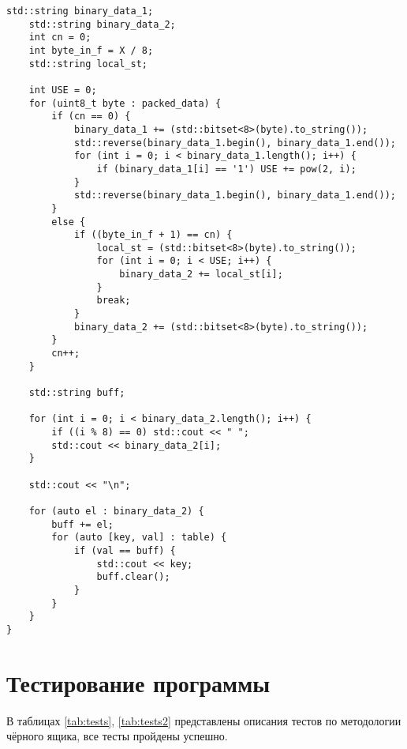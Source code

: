 \begin{lstlisting}[label = list1, caption = Программная реализация описанных алгоритмов]
	std::string binary_data_1;
	std::string binary_data_2;
	int cn = 0;
	int byte_in_f = X / 8;
	std::string local_st;
	
	int USE = 0;
	for (uint8_t byte : packed_data) {
		if (cn == 0) {
			binary_data_1 += (std::bitset<8>(byte).to_string());
			std::reverse(binary_data_1.begin(), binary_data_1.end());
			for (int i = 0; i < binary_data_1.length(); i++) {
				if (binary_data_1[i] == '1') USE += pow(2, i);
			}
			std::reverse(binary_data_1.begin(), binary_data_1.end());
		}
		else {
			if ((byte_in_f + 1) == cn) {
				local_st = (std::bitset<8>(byte).to_string());
				for (int i = 0; i < USE; i++) {
					binary_data_2 += local_st[i];
				}
				break;
			}
			binary_data_2 += (std::bitset<8>(byte).to_string());
		}
		cn++;
	}
	
	std::string buff;
	
	for (int i = 0; i < binary_data_2.length(); i++) {
		if ((i % 8) == 0) std::cout << " ";
		std::cout << binary_data_2[i];
	}
	
	std::cout << "\n";
	
	for (auto el : binary_data_2) {
		buff += el;
		for (auto [key, val] : table) {
			if (val == buff) {
				std::cout << key;
				buff.clear();
			}
		}
	}
}
\end{lstlisting}

\section{Тестирование программы}
В таблицах \ref{tab:tests}, \ref{tab:tests2} представлены описания тестов по методологии чёрного ящика, все тесты пройдены успешно.

